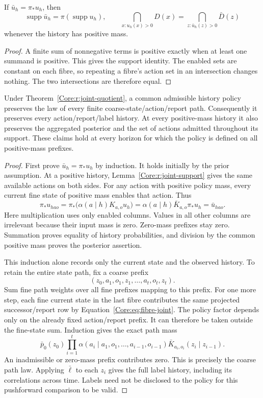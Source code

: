 \begin{Corelemma}\label{Core:r:joint-support}
If $\bar u_h=\pi_*u_h$, then
\[
 \operatorname{supp}\bar u_h=\pi(\operatorname{supp}u_h),\qquad
 \bigcap_{x:u_h(x)>0}D(x)=\bigcap_{z:\bar u_h(z)>0}\bar D(z)
\]
whenever the history has positive mass.
\end{Corelemma}
\begin{proof}
A finite sum of nonnegative terms is positive exactly when at least one summand is positive. This gives the support identity. The enabled sets are constant on each fibre, so repeating a fibre's action set in an intersection changes nothing. The two intersections are therefore equal.
\end{proof}

\begin{Coretheorem}\label{Core:r:joint-history}
Under Theorem~\ref{Core:r:joint-quotient}, a common admissible history policy preserves the law of every finite coarse-state/action/report path. Consequently it preserves every action/report/label history. At every positive-mass history it also preserves the aggregated posterior and the set of actions admitted throughout its support. These claims hold at every horizon for which the policy is defined on all positive-mass prefixes.
\end{Coretheorem}
\begin{proof}
First prove $\bar u_h=\pi_*u_h$ by induction. It holds initially by the prior assumption. At a positive history, Lemma~\ref{Core:r:joint-support} gives the same available actions on both sides. For any action with positive policy mass, every current fine state of positive mass enables that action. Thus
\[
 \pi_*u_{hao}
 =\pi_*\bigl(\alpha(a\mid h)K_{a,o}u_h\bigr)
 =\alpha(a\mid h)\bar K_{a,o}\pi_*u_h
 =\bar u_{hao}.
\]
Here multiplication uses only enabled columns. Values in all other columns are irrelevant because their input mass is zero. Zero-mass prefixes stay zero. Summation proves equality of history probabilities, and division by the common positive mass proves the posterior assertion.

This induction alone records only the current state and the observed history. To retain the entire state path, fix a coarse prefix
\[
 (z_0,a_1,o_1,z_1,\ldots,a_t,o_t,z_t).
\]
Sum fine path weights over all fine prefixes mapping to this prefix. For one more step, each fine current state in the last fibre contributes the same projected successor/report row by Equation~\eqref{Core:eq:fibre-joint}. The policy factor depends only on the already fixed action/report prefix. It can therefore be taken outside the fine-state sum. Induction gives the exact path mass
\[
 \bar p_0(z_0)\prod_{i=1}^{t}
 \alpha(a_i\mid a_1,o_1,\ldots,a_{i-1},o_{i-1})
 \bar K_{a_i,o_i}(z_i\mid z_{i-1}).
\]
An inadmissible or zero-mass prefix contributes zero. This is precisely the coarse path law. Applying $\bar\ell$ to each $z_i$ gives the full label history, including its correlations across time. Labels need not be disclosed to the policy for this pushforward comparison to be valid.
\end{proof}

